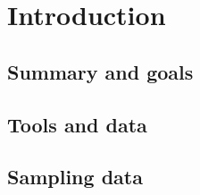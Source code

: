 \section{Introduction}
\subsection{Summary and goals}


\subsection{Tools and data}


\subsection{Sampling data}



